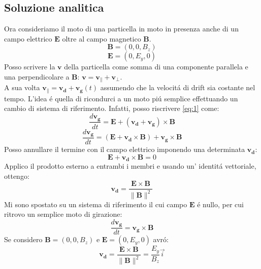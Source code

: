\documentclass[11pt]{article}
\begin{document}
\subsection{Soluzione analitica}
Ora consideriamo il moto di una particella in moto in presenza anche di un campo elettrico $\mathbf{E}$ oltre al campo magnetico $\mathbf{B}$. \\ 
\begin{equation}\mathbf{B}=(0,0,B_z)    \end{equation}
\begin{equation}\mathbf{E}=(0,E_y,0)  \end{equation}
Posso scrivere la $\mathbf{v}$ della particella come somma di una componente parallela e una perpendicolare a $\mathbf{B}$: 
$\mathbf{v} = \mathbf{v_{\parallel}} + \mathbf{v_{\perp}}$. \\
A sua volta $\mathbf{v_{\parallel}} = \mathbf{v_d} + \mathbf{v_g}(t)$
assumendo che la velocitá di drift sia costante nel tempo.
L'idea é quella di ricondurci a un moto piú semplice effettuando un cambio di sistema di riferimento.
Infatti, posso riscrivere \eqref{eq:1} come:
\begin{equation}
\frac{d\mathbf{v_g}}{dt} = \mathbf{E} + (\mathbf{v_d} + \mathbf{v_g}) \times \mathbf{B}\end{equation}
\begin{equation}
\frac{d\mathbf{v_g}}{dt} = \left(\mathbf{E} + \mathbf{v_d} \times \mathbf{B}\right) + \mathbf{v_g} \times \mathbf{B}
\end{equation}
Posso annullare il termine con il campo elettrico imponendo una determinata $\mathbf{v_d}$:
\begin{equation}
\mathbf{E} + \mathbf{v_d} \times \mathbf{B} = 0
\end{equation}
Applico il prodotto esterno a entrambi i membri e usando un' identitá vettoriale, ottengo:
\begin{equation}
\mathbf{v_d} = \frac{\mathbf{E} \times \mathbf{B}}{\|\mathbf{B}\|^2}
\end{equation}
Mi sono spostato su un sistema di riferimento il cui campo $\mathbf{E}$ é nullo, per cui ritrovo un semplice moto di girazione:
\begin{equation}
\frac{d\mathbf{v_g}}{dt} = \mathbf{v_g} \times \mathbf{B}
\end{equation}
Se considero $\mathbf{B}=(0,0,B_z)$ e $\mathbf{E}=(0,E_y,0)$ avró:
\begin{equation}
\mathbf{v_d} = \frac{\mathbf{E} \times \mathbf{B}}{\|\mathbf{B}\|^2} = \frac{E_y}{B_z} \vec{i}
\end{equation}  
\end{document}

